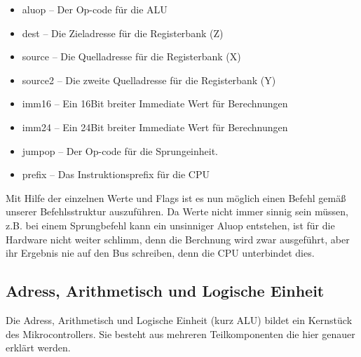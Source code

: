 \begin{itemize}
  \item aluop -- Der Op-code für die ALU
  \item dest --  Die Zieladresse für die Registerbank (Z)
  \item source -- Die Quelladresse für die Registerbank (X)
  \item source2 -- Die zweite Quelladresse für die Registerbank (Y)
  \item imm16 -- Ein 16Bit breiter Immediate Wert für Berechnungen
  \item imm24 -- Ein 24Bit breiter Immediate Wert für Berechnungen
  \item jumpop -- Der Op-code für die Sprungeinheit.
  \item prefix -- Das Instruktionsprefix für die CPU
\end{itemize}
Mit Hilfe der einzelnen Werte und Flags ist es nun möglich einen Befehl gemäß unserer Befehlsstruktur auszuführen. Da Werte nicht immer sinnig sein müssen, z.B. bei einem Sprungbefehl kann ein unsinniger Aluop entstehen, ist für die Hardware nicht weiter schlimm, denn die Berchnung wird zwar ausgeführt, aber ihr Ergebnis nie auf den Bus schreiben, denn die CPU unterbindet dies.
\subsection{Adress, Arithmetisch und Logische Einheit}
Die Adress, Arithmetisch und Logische Einheit (kurz ALU) bildet ein Kernstück des Mikrocontrollers. Sie besteht aus mehreren Teilkomponenten die hier genauer erklärt werden.
